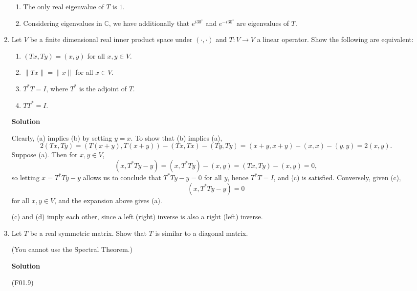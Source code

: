 \documentclass{article}
\begin{document}
\begin{enumerate}
\begin{enumerate}
\item The only real eigenvalue of \(T\) is \(1\).

\item Considering eigenvalues in \(\mathbb{C}\), we have additionally that \(e^{i 30^{\circ}}\) and \(e^{-i 30^{\circ}}\) are eigenvalues of \(T\).

\end{enumerate}



\item Let \(V\) be a finite dimensional real inner product space under \((\cdot, \cdot)\) and \(T : V \to V\) a linear operator.  Show the following are equivalent:

\begin{enumerate}
\item \((Tx,Ty) = (x,y)\) for all \(x,y \in V\).

\item \(\|Tx\| = \|x\|\) for all \(x \in V\).

\item \(T^*T = I\), where \(T^*\) is the adjoint of \(T\).

\item \(TT^* = I\).

\end{enumerate}

{\bf Solution}

Clearly, (a) implies (b) by setting \(y = x\).  To show that (b) implies (a),
\[2(Tx,Ty) = (T(x + y), T(x + y)) - (Tx,Tx) - (Ty,Ty) = (x + y, x + y) - (x,x) - (y,y) = 2(x,y).\]
Suppose (a).  Then for \(x,y \in V\),
\[(x, T^*Ty - y) = (x, T^*Ty) - (x,y) = (Tx,Ty) - (x,y) = 0,\]
so letting \(x = T^*Ty - y\) allows us to conclude that \(T^*Ty - y = 0\) for all \(y\), hence \(T^*T = I\), and (c) is satisfied.  Conversely, given (c),
\[(x, T^*Ty - y) = 0\]
for all \(x,y \in V\), and the expansion above gives (a).

(c) and (d) imply each other, since a left (right) inverse is also a right (left) inverse.



\item Let \(T\) be a real symmetric matrix.  Show that \(T\) is similar to a diagonal matrix.

(You cannot use the Spectral Theorem.)

{\bf Solution}

(F01.9)



\end{enumerate}
\end{document}
